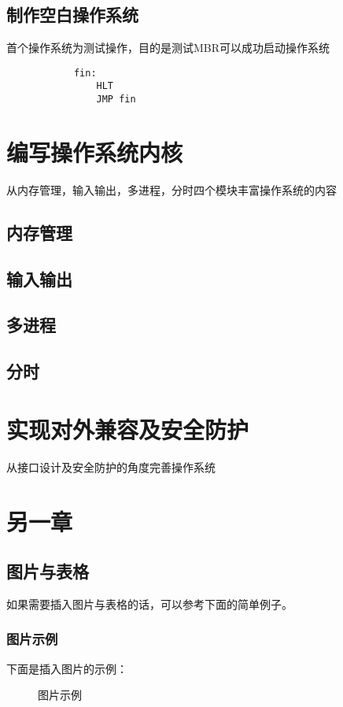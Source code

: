 \documentclass{swfcthesis}
\begin{document}
	\section{制作空白操作系统}
	首个操作系统为测试操作，目的是测试MBR可以成功启动操作系统
	\begin{verbatim}
			fin:
			    HLT
			    JMP fin
	\end{verbatim}
		
\chapter{编写操作系统内核}
从内存管理，输入输出，多进程，分时四个模块丰富操作系统的内容
	\section{内存管理}
	\section{输入输出}
	\section{多进程}
	\section{分时}
	
\chapter{实现对外兼容及安全防护}
从接口设计及安全防护的角度完善操作系统


\chapter{另一章}

\section{图片与表格}

如果需要插入图片与表格的话，可以参考下面的简单例子。

\subsection{图片示例}

下面是插入图片的示例：

\begin{figure}[!ht]
  \centering
  \caption{图片示例}
  \label{fig:hello}
\end{figure}
\end{document}
